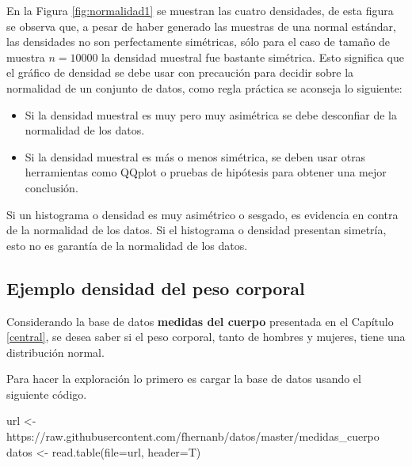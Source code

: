 \documentclass[
]{book}
\makeatletter
\newenvironment{Shaded}{\begin{snugshade}}{\end{snugshade}}
\newcommand{\AttributeTok}[1]{\textcolor[rgb]{0.77,0.63,0.00}{#1}}
\newcommand{\FunctionTok}[1]{\textcolor[rgb]{0.00,0.00,0.00}{#1}}
\newcommand{\NormalTok}[1]{#1}
\newcommand{\OtherTok}[1]{\textcolor[rgb]{0.56,0.35,0.01}{#1}}
\newcommand{\StringTok}[1]{\textcolor[rgb]{0.31,0.60,0.02}{#1}}
\providecommand{\tightlist}{%
  \setlength{\itemsep}{0pt}\setlength{\parskip}{0pt}}
\newenvironment{kframe}{%
\medskip{}
\setlength{\fboxsep}{.8em}
 \def\at@end@of@kframe{}%
 \ifinner\ifhmode%
  \def\at@end@of@kframe{\end{minipage}}%
  \begin{minipage}{\columnwidth}%
 \fi\fi%
 \def\FrameCommand##1{\hskip\@totalleftmargin \hskip-\fboxsep
 \colorbox{shadecolor}{##1}\hskip-\fboxsep
     \hskip-\linewidth \hskip-\@totalleftmargin \hskip\columnwidth}%
 \MakeFramed {\advance\hsize-\width
   \@totalleftmargin\z@ \linewidth\hsize
   \@setminipage}}%
 {\par\unskip\endMakeFramed%
 \at@end@of@kframe}
\renewenvironment{Shaded}{\begin{kframe}}{\end{kframe}}
\newenvironment{rmdblock}[1]
  {
  \begin{itemize}
  \renewcommand{\labelitemi}{
    \raisebox{-.7\height}[0pt][0pt]{
      {\setkeys{Gin}{width=3em,keepaspectratio}\texttt{[image: images/\#1]}}
    }
  }
  \setlength{\fboxsep}{1em}
  \begin{kframe}
  \item
  }
  {
  \end{kframe}
  \end{itemize}
  }
\newenvironment{rmdwarning}
  {\begin{rmdblock}{warning}}
  {\end{rmdblock}}
\makeatother
\begin{document}
En la Figura \ref{fig:normalidad1} se muestran las cuatro densidades, de esta figura se observa que, a pesar de haber generado las muestras de una normal estándar, las densidades no son perfectamente simétricas, sólo para el caso de tamaño de muestra \(n=10000\) la densidad muestral fue bastante simétrica. Esto significa que el gráfico de densidad se debe usar con precaución para decidir sobre la normalidad de un conjunto de datos, como regla práctica se aconseja lo siguiente:

\begin{itemize}
\tightlist
\item
  Si la densidad muestral es muy pero muy asimétrica se debe desconfiar de la normalidad de los datos.
\item
  Si la densidad muestral es más o menos simétrica, se deben usar otras herramientas como QQplot o pruebas de hipótesis para obtener una mejor conclusión.
\end{itemize}

\begin{rmdwarning}
Si un histograma o densidad es muy asimétrico o sesgado, es evidencia en contra de la normalidad de los datos. Si el histograma o densidad presentan simetría, esto no es garantía de la normalidad de los datos.
\end{rmdwarning}

\hypertarget{ejemplo-densidad-del-peso-corporal}{%
\subsection*{Ejemplo densidad del peso corporal}\label{ejemplo-densidad-del-peso-corporal}}

Considerando la base de datos \textbf{medidas del cuerpo} presentada en el Capítulo \ref{central}, se desea saber si el peso corporal, tanto de hombres y mujeres, tiene una distribución normal.

Para hacer la exploración lo primero es cargar la base de datos usando el siguiente código.

\begin{Shaded}
\begin{Highlighting}[]
\NormalTok{url }\OtherTok{\textless{}{-}} \StringTok{\textquotesingle{}https://raw.githubusercontent.com/fhernanb/datos/master/medidas\_cuerpo\textquotesingle{}}
\NormalTok{datos }\OtherTok{\textless{}{-}} \FunctionTok{read.table}\NormalTok{(}\AttributeTok{file=}\NormalTok{url, }\AttributeTok{header=}\NormalTok{T)}
\end{Highlighting}
\end{Shaded}
\end{document}
